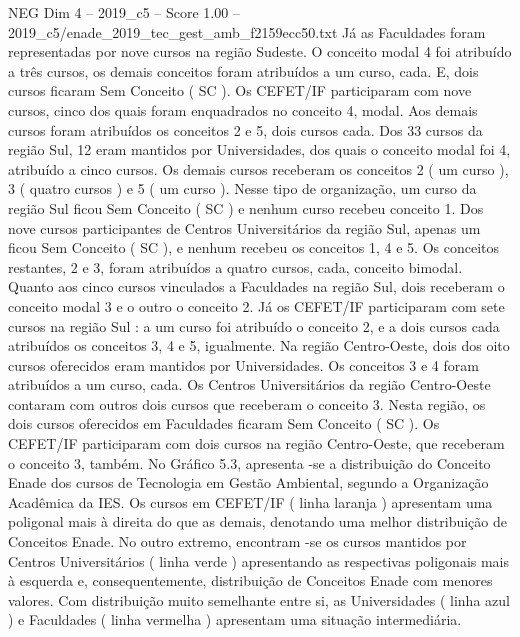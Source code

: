 \begin{textsample}{NEG Dim 4 – 2019\_c5 – Score 1.00 – 2019\_c5/enade\_2019\_tec\_gest\_amb\_f2159ecc50.txt}
Já as Faculdades foram representadas por nove cursos na região Sudeste.
O conceito modal 4 foi atribuído a três cursos, os demais conceitos foram atribuídos a um curso, cada.
E, dois cursos ficaram Sem Conceito ( SC ).
Os CEFET/IF participaram com nove cursos, cinco dos quais foram enquadrados no conceito 4, modal.
Aos demais cursos foram atribuídos os conceitos 2 e 5, dois cursos cada.
Dos 33 cursos da região Sul, 12 eram mantidos por Universidades, dos quais o conceito modal foi 4, atribuído a cinco cursos.
Os demais cursos receberam os conceitos 2 ( um curso ), 3 ( quatro cursos ) e 5 ( um curso ).
Nesse tipo de organização, um curso da região Sul ficou Sem Conceito ( SC ) e nenhum curso recebeu conceito 1.
Dos nove cursos participantes de Centros Universitários da região Sul, apenas um ficou Sem Conceito ( SC ), e nenhum recebeu os conceitos 1, 4 e 5.
Os conceitos restantes, 2 e 3, foram atribuídos a quatro cursos, cada, conceito bimodal.
Quanto aos cinco cursos vinculados a Faculdades na região Sul, dois receberam o conceito modal 3 e o outro o conceito 2.
Já os CEFET/IF participaram com sete cursos na região Sul : a um curso foi atribuído o conceito 2, e a dois cursos cada atribuídos os conceitos 3, 4 e 5, igualmente.
Na região Centro-Oeste, dois dos oito cursos oferecidos eram mantidos por Universidades.
Os conceitos 3 e 4 foram atribuídos a um curso, cada.
Os Centros Universitários da região Centro-Oeste contaram com outros dois cursos que receberam o conceito 3.
Nesta região, os dois cursos oferecidos em Faculdades ficaram Sem Conceito ( SC ).
Os CEFET/IF participaram com dois cursos na região Centro-Oeste, que receberam o conceito 3, também.
No Gráfico 5.3, apresenta -se a distribuição do Conceito Enade dos cursos de Tecnologia em Gestão Ambiental, segundo a Organização Acadêmica da IES.
Os cursos em CEFET/IF ( linha laranja ) apresentam uma poligonal mais à direita do que as demais, denotando uma melhor distribuição de Conceitos Enade.
No outro extremo, encontram -se os cursos mantidos por Centros Universitários ( linha verde ) apresentando as respectivas poligonais mais à esquerda e, consequentemente, distribuição de Conceitos Enade com menores valores.
Com distribuição muito semelhante entre si, as Universidades ( linha azul ) e Faculdades ( linha vermelha ) apresentam uma situação intermediária.

\end{textsample}
